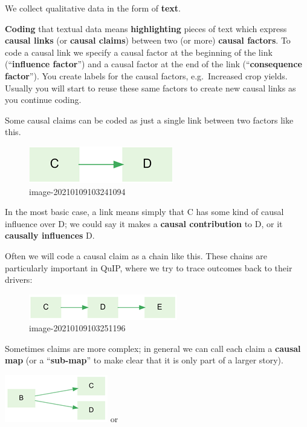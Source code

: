 \documentclass[
]{book}
\begin{document}
We collect qualitative data in the form of \textbf{text}.

\textbf{Coding} that textual data means \textbf{highlighting} pieces of text which express \textbf{causal links} (or \textbf{causal claims}) between two (or more) \textbf{causal factors}. To code a causal link we specify a causal factor at the beginning of the link (``\textbf{influence factor}'') and a causal factor at the end of the link (``\textbf{consequence factor}''). You create labels for the causal factors, e.g.~Increased crop yields. Usually you will start to reuse these same factors to create new causal links as you continue coding.

Some causal claims can be coded as just a single link between two factors like this.

\begin{figure}
\centering
\includegraphics{_assets/image-20210109103241094.png}
\caption{image-20210109103241094}
\end{figure}

In the most basic case, a link means simply that C has some kind of causal influence over D; we could say it makes a \textbf{causal contribution} to D, or it \textbf{causally influences} D.

Often we will code a causal claim as a chain like this. These chains are particularly important in QuIP, where we try to trace outcomes back to their drivers:

\begin{figure}
\centering
\includegraphics{_assets/image-20210109103251196.png}
\caption{image-20210109103251196}
\end{figure}

Sometimes claims are more complex; in general we can call each claim a \textbf{causal map} (or a ``\textbf{sub-map}'' to make clear that it is only part of a larger story).

\includegraphics{_assets/image-20210109103257743.png} or
\end{document}
